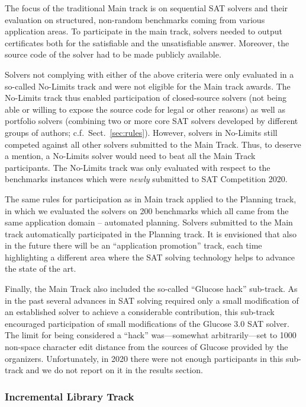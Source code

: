\documentclass{elsarticle}
\begin{document}
The focus of the traditional Main track is on sequential SAT solvers and their evaluation on structured, non-random benchmarks coming from various application areas. To participate in the main track, solvers needed to output certificates both for the satisfiable and the unsatisfiable answer. Moreover, the source code of the solver had to be made publicly available. 

Solvers not complying with either of the above criteria were only evaluated in a so-called No-Limits track and were not eligible for the Main track awards.
The No-Limits track thus enabled participation of closed-source solvers (not being able or willing to expose the source code for legal or other reasons) 
as well as portfolio solvers (combining two or more core SAT solvers developed by different groups of authors; c.f.~Sect.~\ref{sec:rules}).
However, solvers in No-Limits still competed against all other solvers submitted to the Main Track.
Thus, to deserve a mention, a No-Limits solver would need to beat all the Main Track participants.
The No-Limits track was only evaluated with respect to the benchmarks instances which were \emph{newly} submitted to SAT Competition 2020.

The same rules for participation as in Main track applied to the Planning track, in which we evaluated the solvers on 200 benchmarks 
which all came from the same application domain -- automated planning. 
Solvers submitted to the Main track automatically participated in the Planning track.
It is envisioned that also in the future there will be an ``application promotion'' track,
each time highlighting a different area where the SAT solving technology helps to advance the state of the art.

Finally, the Main Track also included the so-called ``Glucose hack'' sub-track. 
As in the past several advances in SAT solving required only a small modification of an established solver
to achieve a considerable contribution, this sub-track encouraged participation 
of small modifications of the Glucose 3.0 SAT solver. The limit for being considered a ``hack''
was---somewhat arbitrarily---set to 1000 non-space character edit distance from the sources of Glucose provided by the organizers. 
Unfortunately, in 2020 there were not enough participants in this sub-track and we do not report on it 
in the results section.

\subsubsection{Incremental Library Track}
\end{document}
